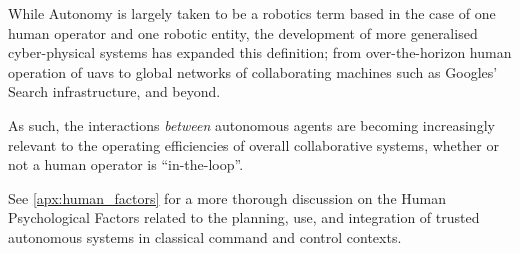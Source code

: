 While Autonomy is largely taken to be a robotics term based in the case of one human operator and one robotic entity, the development of more generalised cyber-physical systems has expanded this definition; from over-the-horizon human operation of \glspl{uav} to global networks of collaborating machines such as Googles' Search infrastructure, and beyond.

As such, the interactions \emph{between} autonomous agents are becoming increasingly relevant to the operating efficiencies of overall collaborative systems, whether or not a human operator is ``in-the-loop''.

See \autoref{apx:human_factors} for a more thorough discussion on the Human Psychological Factors related to the planning, use, and integration of trusted autonomous systems in classical command and control contexts.


